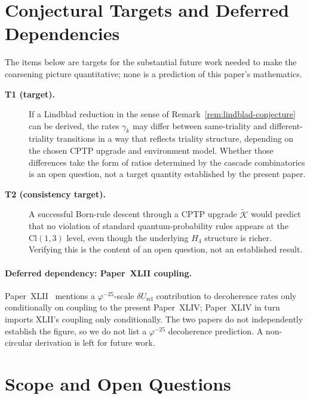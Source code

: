 \documentclass[12pt]{article}
\theoremstyle{definition}
\theoremstyle{remark}
\newcommand{\Cl}{\mathrm{Cl}}
\newcommand{\Kcal}{\mathcal{K}}
\begin{document}
\section{Conjectural Targets and Deferred Dependencies}\label{sec:predictions}

The items below are targets for the substantial future work needed to make the coarsening picture quantitative; none is a prediction of this paper's mathematics.

\begin{description}
\item[\textbf{T1 (target).}] If a Lindblad reduction in the sense of Remark~\ref{rem:lindblad-conjecture} can be derived, the rates $\gamma_k$ may differ between same-triality and different-triality transitions in a way that reflects triality structure, depending on the chosen CPTP upgrade and environment model. Whether those differences take the form of ratios determined by the cascade combinatorics is an open question, not a target quantity established by the present paper.
\item[\textbf{T2 (consistency target).}] A successful Born-rule descent through a CPTP upgrade $\widetilde{\Kcal}$ would predict that no violation of standard quantum-probability rules appears at the $\Cl(1,3)$ level, even though the underlying $H_4$ structure is richer. Verifying this is the content of an open question, not an established result.
\end{description}

\paragraph{Deferred dependency: Paper~XLII coupling.} Paper~XLII~\citep{SmartXLII} mentions a $\varphi^{-25}$-scale $\delta U_{\mathrm{rel}}$ contribution to decoherence rates only conditionally on coupling to the present Paper~XLIV; Paper~XLIV in turn imports XLII's coupling only conditionally. The two papers do not independently establish the figure, so we do not list a $\varphi^{-25}$ decoherence prediction. A non-circular derivation is left for future work.

\section{Scope and Open Questions}\label{sec:scope}
\end{document}
